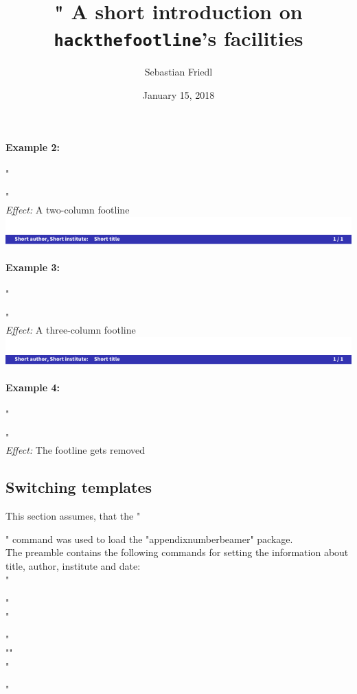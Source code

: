 \documentclass[11pt]{ltxdoc}
\begin{document}
	
	\paragraph{Example 2:}
	"\usepackage[twocols]{hackthefootline}" \\
	\textit{Effect:} A two-column footline \\
	\includegraphics[page=2, width=\textwidth, trim=0 0 0 15, clip]{hackthefootline-examples}
	
	\paragraph{Example 3:}
	"\usepackage[threecols]{hackthefootline}" \\
	\textit{Effect:} A three-column footline \\
	\includegraphics[page=3, width=\textwidth, trim=0 0 0 15, clip]{hackthefootline-examples}
	
	\paragraph{Example 4:}
	"\usepackage{hackthefootline}" \\
	\textit{Effect:} The footline gets removed
	
	
	\subsection{Switching templates}\label{examples-switchtemplates}
	This section assumes, that the "\usepackage[onecol]{hackthefootline}" command was used to load the "appendixnumberbeamer" package. \\[\medskipamount]
	The preamble contains the following commands for setting the information about title, author, institute and date: \\[\smallskipamount]
	"\title[Short Introduction]{%
	"    A short introduction on \texttt{hackthefootline}'s facilities}" \\
	"\author[S. Friedl]{Sebastian Friedl}" \\
	"" \\
	"\date[2018/01/15]{January 15, 2018}"
	
\end{document}
